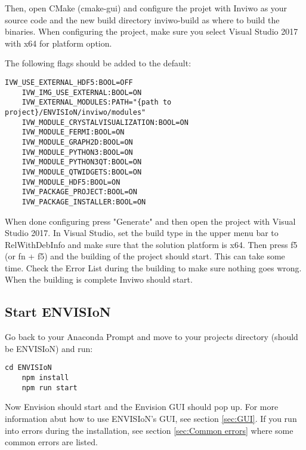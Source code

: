 Then, open CMake (cmake-gui) and configure the projet with Inviwo as your source code and the new build directory inviwo-build as where to build the binaries. When configuring the project, make sure you select Visual Studio 2017 with x64 for platform option.

The following flags should be added to the default:
\begin{lstlisting}[frame = single, breaklines=true]
    IVW_USE_EXTERNAL_HDF5:BOOL=OFF
    IVW_IMG_USE_EXTERNAL:BOOL=ON
    IVW_EXTERNAL_MODULES:PATH="{path to project}/ENVISIoN/inviwo/modules"
    IVW_MODULE_CRYSTALVISUALIZATION:BOOL=ON
    IVW_MODULE_FERMI:BOOL=ON
    IVW_MODULE_GRAPH2D:BOOL=ON
    IVW_MODULE_PYTHON3:BOOL=ON
    IVW_MODULE_PYTHON3QT:BOOL=ON
    IVW_MODULE_QTWIDGETS:BOOL=ON
    IVW_MODULE_HDF5:BOOL=ON
    IVW_PACKAGE_PROJECT:BOOL=ON
    IVW_PACKAGE_INSTALLER:BOOL=ON
\end{lstlisting}

When done configuring press "Generate" and then open the project with Visual Studio 2017. In Visual Studio, set the build type in the upper menu bar to RelWithDebInfo and make sure that the solution platform is x64. Then press f5 (or fn + f5) and the building of the project should start. This can take some time. Check the Error List during the building to make sure nothing goes wrong. When the building is complete Inviwo should start.

\subsection{Start ENVISIoN}
Go back to your Anaconda Prompt and move to your projects directory (should be ENVISIoN) and run:

\begin{lstlisting}[frame = single, breaklines=true]
    cd ENVISIoN
    npm install
    npm run start
\end{lstlisting}

Now Envision should start and the Envision GUI should pop up. For more information abut how to use ENVISIoN's GUI, see section \ref{sec:GUI}. If you run into errors during the installation, see section \ref{sec:Common errors} where some common errors are listed.


